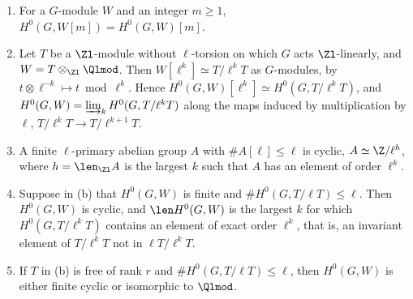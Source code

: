 \begin{lemma}\label{lem:cohomology:h0-torsion}
\begin{enumerate}[label=(\alph*)]
\item \sloppy For a $G$-module $W$ and an integer $m\ge1$, $H^0(G,W[m])=H^0(G,W)[m]$.
\item \sloppy Let $T$ be a $\Zl$-module without $\ell$-torsion on which $G$ acts $\Zl$-linearly, and $W=T\otimes_{\Zl}\Qlmod$. Then $W[\ell^k]\simeq T/\ell^kT$ as
$G$-modules, by $t\otimes\ell^{-k}\mapsto t\bmod\ell^k$. Hence $H^0(G,W)[\ell^k]\simeq H^0(G,T/\ell^kT)$, and $H^0(G,W)=\varinjlim_kH^0(G,T/\ell^kT)$ along the maps
induced by multiplication by $\ell$, $T/\ell^kT\to T/\ell^{k+1}T$.
\item A finite $\ell$-primary abelian group $A$ with $\#A[\ell]\le\ell$ is cyclic, $A\simeq\Z/\ell^h$, where $h=\len_{\Zl}A$ is the largest $k$ such that $A$ has an
element of order $\ell^k$.
\item Suppose in (b) that $H^0(G,W)$ is finite and $\#H^0(G,T/\ell T)\le\ell$. Then $H^0(G,W)$ is cyclic, and $\len H^0(G,W)$ is the largest $k$ for which
$H^0(G,T/\ell^kT)$ contains an element of exact order $\ell^k$, that is, an invariant element of $T/\ell^kT$ not in $\ell T/\ell^kT$.
\item If $T$ in (b) is free of rank $r$ and $\#H^0(G,T/\ell T)\le\ell$, then $H^0(G,W)$ is either finite cyclic or isomorphic to $\Qlmod$.
\end{enumerate}
\end{lemma}


